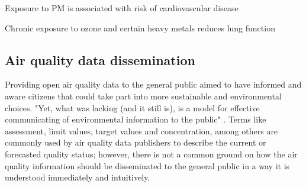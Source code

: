 Exposure to PM is associated with risk of cardiovascular disease \cite{Polichetti2009}

Chronic exposure to ozone and certain heavy metals reduces lung function \cite{Kampa2008}

\subsection{Air quality data dissemination}
Providing open air quality data to the general public aimed to have informed and aware citizens that could take part into more sustainable and environmental choices. "Yet, what was lacking (and it still is), is a model for effective communicating of environmental information to the public" \cite{Thinh2007}. Terms like assessment, limit values, target values and concentration, among others are commonly used by air quality data publishers to describe the current or forecasted quality status; however, there is not a common ground on how the air quality information should be disseminated to the general public in a way it is understood immediately and intuitively. 

